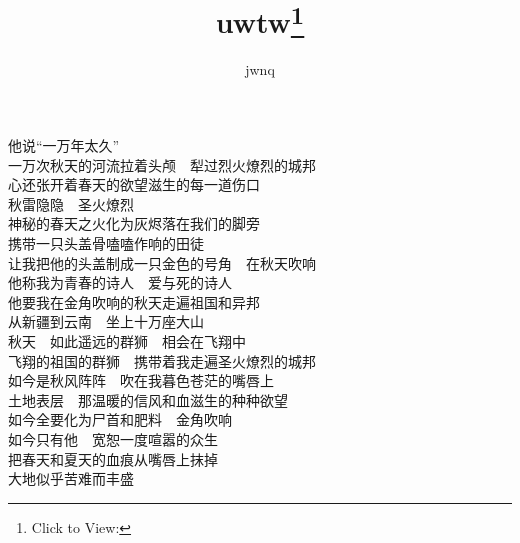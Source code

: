 \documentclass{article}
\title{uwtw\footnote{Click to View:\url{}}}
\author{jwnq}
\date{}
\begin{document}

\setlength\parindent{0pt}

\Large

他说“一万年太久”\\


一万次秋天的河流拉着头颅　犁过烈火燎烈的城邦\\
心还张开着春天的欲望滋生的每一道伤口\\


秋雷隐隐　圣火燎烈\\
神秘的春天之火化为灰烬落在我们的脚旁\\


携带一只头盖骨嗑嗑作响的田徒\\
让我把他的头盖制成一只金色的号角　在秋天吹响\\


他称我为青春的诗人　爱与死的诗人\\
他要我在金角吹响的秋天走遍祖国和异邦\\


从新疆到云南　坐上十万座大山\\
秋天　如此遥远的群狮　相会在飞翔中\\


飞翔的祖国的群狮　携带着我走遍圣火燎烈的城邦\\
如今是秋风阵阵　吹在我暮色苍茫的嘴唇上\\


土地表层　那温暖的信风和血滋生的种种欲望\\
如今全要化为尸首和肥料　金角吹响\\


如今只有他　宽恕一度喧嚣的众生\\
把春天和夏天的血痕从嘴唇上抹掉\\
大地似乎苦难而丰盛\\
\end{document}
